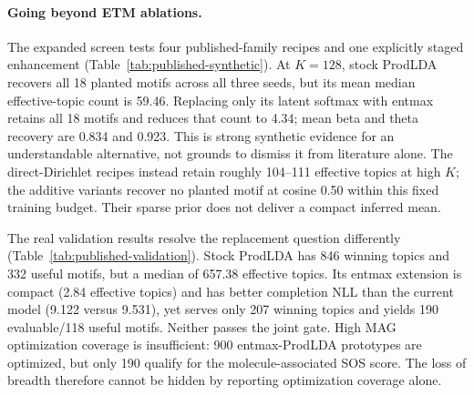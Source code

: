 \documentclass[10pt,a4paper]{article}
\begin{document}
\paragraph{Going beyond ETM ablations.}
The expanded screen tests four published-family recipes and one explicitly
staged enhancement (Table~\ref{tab:published-synthetic}). At $K=128$, stock
ProdLDA recovers all 18 planted motifs across all three seeds, but its mean
median effective-topic count is 59.46. Replacing only its latent softmax with
entmax retains all 18 motifs and reduces that count to 4.34; mean beta and
theta recovery are 0.834 and 0.923. This is strong synthetic evidence for an
understandable alternative, not grounds to dismiss it from literature alone.
The direct-Dirichlet recipes instead retain roughly 104--111 effective topics
at high $K$; the additive variants recover no planted motif at cosine 0.50
within this fixed training budget. Their sparse prior does not deliver a
compact inferred mean.

The real validation results resolve the replacement question differently
(Table~\ref{tab:published-validation}). Stock ProdLDA has 846 winning topics
and 332 useful motifs, but a median of 657.38 effective topics. Its entmax
extension is compact (2.84 effective topics) and has better completion NLL than
the current model (9.122 versus 9.531), yet serves only 207 winning topics and
yields 190 evaluable/118 useful motifs. Neither passes the joint gate.
High MAG optimization coverage is insufficient: 900 entmax-ProdLDA prototypes
are optimized, but only 190 qualify for the molecule-associated SOS score.
The loss of breadth therefore cannot be hidden by reporting optimization
coverage alone.

\begin{table}[htbp]
\centering
\small
\setlength{\tabcolsep}{4pt}
\caption{Published-family real validation, $K=1000$, seed 7043.
Column definitions and the common spectrum-association rule follow
Table~\ref{tab:minimal-validation}. ProdLDA rows use their actual PoE decoder
for NLL and one-hot conditional topic prototypes for chemical evaluation;
they are not scored as additive LDA emissions. Recipes differ in neural
width and optimization settings as stated in
Section~\ref{sec:simplification-protocol}.}
\label{tab:published-validation}
\end{table}
\end{document}
